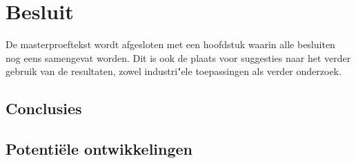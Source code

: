 \chapter{Besluit}
\label{besluit}


De masterproeftekst wordt afgesloten met een hoofdstuk waarin alle
besluiten nog eens samengevat worden. Dit is ook de plaats voor suggesties
naar het verder gebruik van de resultaten, zowel industri"ele toepassingen
als verder onderzoek.

\section{Conclusies}

\section{Potenti\"ele ontwikkelingen}

